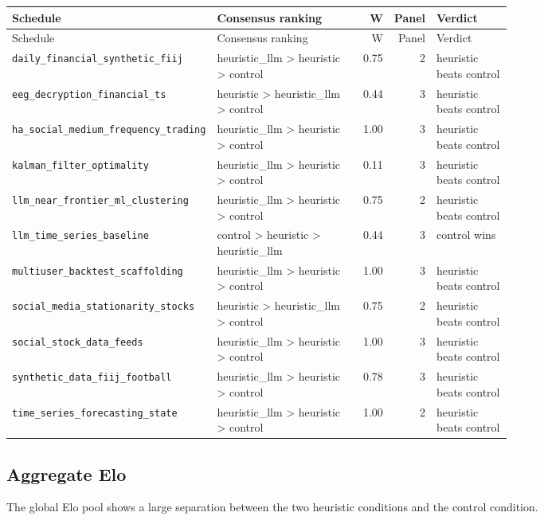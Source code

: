 \documentclass[11pt]{article}
\begin{document}
\scriptsize
\begin{longtable}{P{0.25\linewidth}P{0.32\linewidth}rrP{0.16\linewidth}}
\toprule
Schedule & Consensus ranking & W & Panel & Verdict \\
\midrule
\endfirsthead
\toprule
Schedule & Consensus ranking & W & Panel & Verdict \\
\midrule
\endhead
\texttt{daily\_financial\_synthetic\_fiij} & heuristic\_llm > heuristic > control & 0.75 & 2 & heuristic beats control \\
\texttt{eeg\_decryption\_financial\_ts} & heuristic > heuristic\_llm > control & 0.44 & 3 & heuristic beats control \\
\texttt{ha\_social\_medium\_frequency\_trading} & heuristic\_llm > heuristic > control & 1.00 & 3 & heuristic beats control \\
\texttt{kalman\_filter\_optimality} & heuristic\_llm > heuristic > control & 0.11 & 3 & heuristic beats control \\
\texttt{llm\_near\_frontier\_ml\_clustering} & heuristic\_llm > heuristic > control & 0.75 & 2 & heuristic beats control \\
\texttt{llm\_time\_series\_baseline} & control > heuristic > heuristic\_llm & 0.44 & 3 & control wins \\
\texttt{multiuser\_backtest\_scaffolding} & heuristic\_llm > heuristic > control & 1.00 & 3 & heuristic beats control \\
\texttt{social\_media\_stationarity\_stocks} & heuristic > heuristic\_llm > control & 0.75 & 2 & heuristic beats control \\
\texttt{social\_stock\_data\_feeds} & heuristic\_llm > heuristic > control & 1.00 & 3 & heuristic beats control \\
\texttt{synthetic\_data\_fiij\_football} & heuristic\_llm > heuristic > control & 0.78 & 3 & heuristic beats control \\
\texttt{time\_series\_forecasting\_state} & heuristic\_llm > heuristic > control & 1.00 & 2 & heuristic beats control \\
\bottomrule
\end{longtable}
\normalsize

\subsection{Aggregate Elo}

The global Elo pool shows a large separation between the two heuristic
conditions and the control condition.
\end{document}
